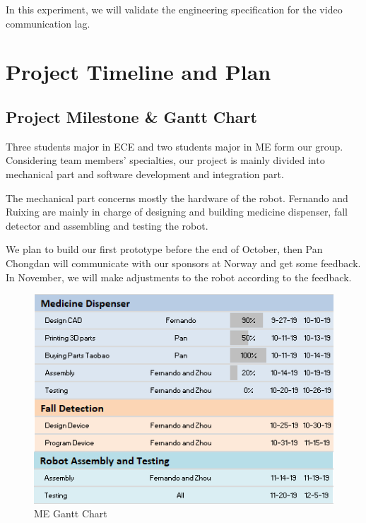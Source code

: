 \documentclass[12pt]{article}
\newcommand{\gadd}[1]{{\color{gray} #1}}
\begin{document}
In this experiment, we will validate the engineering specification for the video communication lag.
\section{Project Timeline and Plan}
\gadd{
\subsection{Project Milestone \& Gantt Chart}
Three students major in ECE and two students major in ME form our group.
Considering team members’ specialties, our project is mainly divided into mechanical
part and software development and integration part.
\par The mechanical part concerns mostly the hardware of the robot. Fernando and Ruixing are mainly in charge of designing and building medicine dispenser,
fall detector and assembling and testing the robot.
\par We plan to build our first prototype before the end of October, then Pan Chongdan will communicate with our sponsors at Norway and get some feedback. In November, we will make adjustments to the robot according to the feedback.
\begin{figure}[H]
	\centering
	\includegraphics[width=0.75\linewidth]{ganttA.png}
	\caption{ME Gantt Chart}
\end{figure}

}
\end{document}
